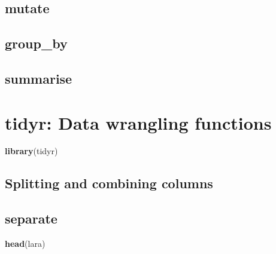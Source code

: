 \documentclass[]{book}
\newenvironment{Shaded}{\begin{snugshade}}{\end{snugshade}}
\newcommand{\KeywordTok}[1]{\textcolor[rgb]{0.13,0.29,0.53}{\textbf{#1}}}
\newcommand{\NormalTok}[1]{#1}
\begin{document}
\hypertarget{mutate}{%
\section*{\texorpdfstring{\textbf{mutate}}{mutate}}\label{mutate}}

\hypertarget{group_by}{%
\section*{\texorpdfstring{\textbf{group\_by}}{group\_by}}\label{group_by}}

\hypertarget{summarise}{%
\section*{\texorpdfstring{\textbf{summarise}}{summarise}}\label{summarise}}

\hypertarget{tidyr-data-wrangling-functions}{%
\chapter{tidyr: Data wrangling functions}\label{tidyr-data-wrangling-functions}}

\begin{Shaded}
\begin{Highlighting}[]
\KeywordTok{library}\NormalTok{(tidyr)}
\end{Highlighting}
\end{Shaded}

\hypertarget{sepunite}{%
\section*{Splitting and combining columns}\label{sepunite}}

\hypertarget{separate}{%
\section*{\texorpdfstring{\textbf{separate}}{separate}}\label{separate}}

\begin{Shaded}
\begin{Highlighting}[]
\KeywordTok{head}\NormalTok{(lara)}
\end{Highlighting}
\end{Shaded}
\end{document}
